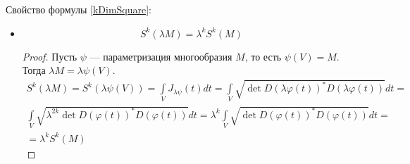 \documentclass[a5paper]{article}
\theoremstyle{plain}
\theoremstyle{definition}
\numberwithin{through}{section}
\numberwithin{equation}{section}
\begin{document}
Свойство формулы \ref{kDimSquare}:
\begin{itemize}
	 \item 
	 \begin{equation}
	 \label{SkNLinear}
	 	S^k(\lambda M) = \lambda^k S^k(M)
	 \end{equation}
	 
	 \begin{proof}
	 	Пусть $\psi$ --- параметризация многообразия $M$, то есть $\psi(V) = M$. Тогда
	 	$\lambda M = \lambda \psi(V)$. 
		 \begin{eqnarray}\nonumber
		 	S^k(\lambda M) = S^k (\lambda \psi(V)) = \int\limits_V J_{\lambda\psi}(t)dt = 
		 	\int\limits_{V} \sqrt{\det D(\lambda\varphi(t))^*D(\lambda\varphi(t))}dt = \\\nonumber
		 	\int\limits_{V} \sqrt{\lambda^{2k}\det D(\varphi(t))^*D(\varphi(t))}dt = 
		 	\lambda^{k}\int\limits_{V} \sqrt{\det D(\varphi(t))^*D(\varphi(t))}dt =\\\nonumber
		 	= \lambda^k S^k(M)
		 \end{eqnarray}
		 
	 \end{proof}
	 
\end{itemize}
\end{document}

